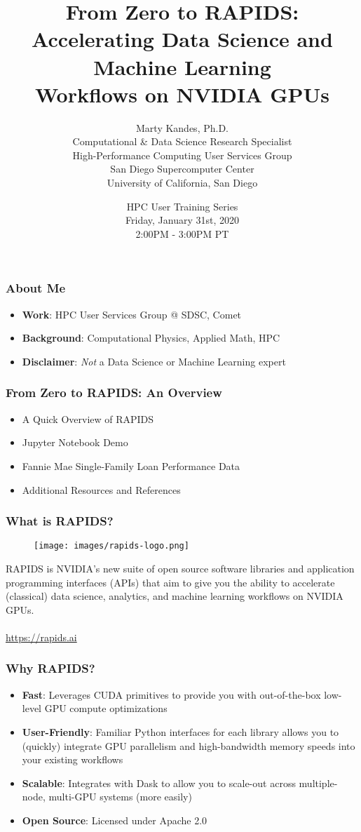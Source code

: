 \documentclass{beamer}
\title{From Zero to RAPIDS: \\
       Accelerating Data Science and Machine Learning \\
       Workflows on NVIDIA GPUs}
\author{Marty Kandes, Ph.D. \\
   Computational \& Data Science Research Specialist \\
   High-Performance Computing User Services Group \\ 
   San Diego Supercomputer Center \\
   University of California, San Diego}
\date{HPC User Training Series\\
   Friday, January 31st, 2020 \\
   2:00PM - 3:00PM PT}
\begin{document}
\maketitle

\begin{frame}
   \frametitle{About Me}
   \begin{itemize}
      \setlength\itemsep{1.5em}
      \item \textbf{Work}: HPC User Services Group @ SDSC, Comet
      \item \textbf{Background}: Computational Physics, Applied Math, HPC
      \item \textbf{Disclaimer}: \textit{Not} a Data Science or Machine Learning expert
   \end{itemize}
\end{frame}

\begin{frame}
   \frametitle{From Zero to RAPIDS: An Overview}
   \begin{itemize}\setlength\itemsep{1.5em}
      \item A Quick Overview of RAPIDS
      \item Jupyter Notebook Demo
      \item Fannie Mae Single-Family Loan Performance Data
      \item Additional Resources and References
   \end{itemize}
\end{frame}

\begin{frame}
   \frametitle{What is RAPIDS?}
   \begin{figure}[htbp]
      \texttt{[image: images/rapids-logo.png]}
   \end{figure}
   RAPIDS is NVIDIA's new suite of open source software libraries and
   application programming interfaces (APIs) that aim to give you the
   ability to accelerate (classical) data science, analytics, and
   machine learning workflows on NVIDIA GPUs.
   \\ \ \\
   \url{https://rapids.ai}
\end{frame}

\begin{frame}
   \frametitle{Why RAPIDS?}
   \begin{itemize}\setlength\itemsep{1.5em}
      \item \textbf{Fast}: Leverages CUDA primitives to provide you with
         out-of-the-box low-level GPU compute optimizations
      \item \textbf{User-Friendly}: Familiar Python interfaces for each
         library allows you to (quickly) integrate GPU parallelism and 
         high-bandwidth memory speeds into your existing workflows
      \item \textbf{Scalable}: Integrates with Dask to allow you to scale-out
         across multiple-node, multi-GPU systems (more easily)
      \item \textbf{Open Source}: Licensed under Apache 2.0
   \end{itemize}
\end{frame}
\end{document}
